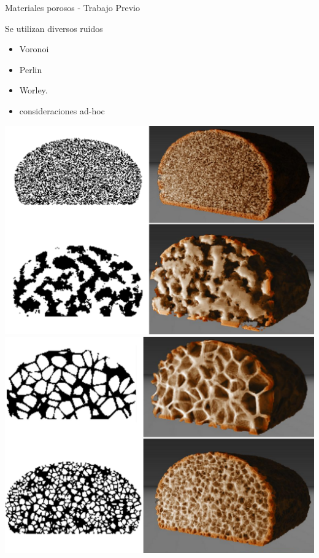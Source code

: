 \documentclass[spanish,unknownkeysallowed]{beamer}
\begin{document}
\begin{frame}{Materiales porosos - Trabajo Previo}

Se utilizan diversos ruidos

\begin{itemize}
\item Voronoi
\item Perlin
\item Worley.
\item consideraciones ad-hoc
\end{itemize}

\includegraphics[scale = 0.15]{../figures/Fig8}
\includegraphics[scale = 0.15]{../figures/Fig9CAVW}
\end{frame}
\end{document}

